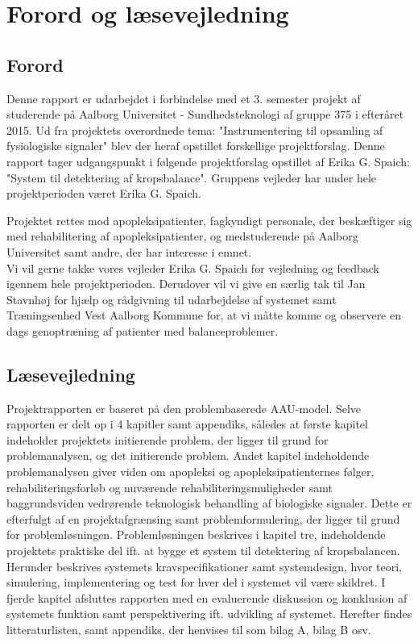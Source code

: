 \chapter*{Forord og læsevejledning}
\section{Forord}
Denne rapport er udarbejdet i forbindelse med et 3. semester projekt af studerende på Aalborg Universitet - Sundhedsteknologi af gruppe 375 i efteråret 2015. Ud fra projektets overordnede tema: "Instrumentering til opsamling af fysiologiske signaler" blev der heraf opstillet forskellige projektforslag. Denne rapport tager udgangspunkt i følgende projektforslag opstillet af Erika G. Spaich: "System til detektering af kropsbalance". Gruppens vejleder har under hele projektperioden været Erika G. Spaich.

Projektet rettes mod apopleksipatienter, fagkyndigt personale, der beskæftiger sig med rehabilitering af apopleksipatienter, og medstuderende på Aalborg Universitet samt andre, der har interesse i emnet. \\
Vi vil gerne takke vores vejleder Erika G. Spaich for vejledning og feedback igennem hele projektperioden. Derudover vil vi give en særlig tak til Jan Stavnhøj for hjælp og rådgivning til udarbejdelse af systemet samt Træningsenhed Vest Aalborg Kommune for, at vi måtte komme og observere en dags genoptræning af patienter med balanceproblemer. 

\section{Læsevejledning}
Projektrapporten er baseret på den problembaserede AAU-model. Selve rapporten er delt op i 4 kapitler samt appendiks, således at første kapitel indeholder projektets initierende problem, der ligger til grund for problemanalysen, og det initierende problem. Andet kapitel indeholdende problemanalysen giver viden om apopleksi og apopleksipatienternes følger, rehabiliteringsforløb og nuværende rehabiliteringsmuligheder samt baggrundsviden vedrørende teknologisk behandling af biologiske signaler.  Dette er efterfulgt af en projektafgrænsing samt problemformulering, der ligger til grund for problemløsningen. Problemløsningen beskrives i kapitel tre, indeholdende projektets praktiske del ift. at bygge et system til detektering af kropsbalancen. Herunder beskrives systemets kravspecifikationer samt systemdesign, hvor teori, simulering, implementering og test for hver del i systemet vil være skildret. I fjerde kapitel afsluttes rapporten med en evaluerende diskussion og konklusion af systemets funktion samt perspektivering ift. udvikling af systemet. Herefter findes litteraturlisten, samt appendiks, der henvises til som bilag A, bilag B osv. 


